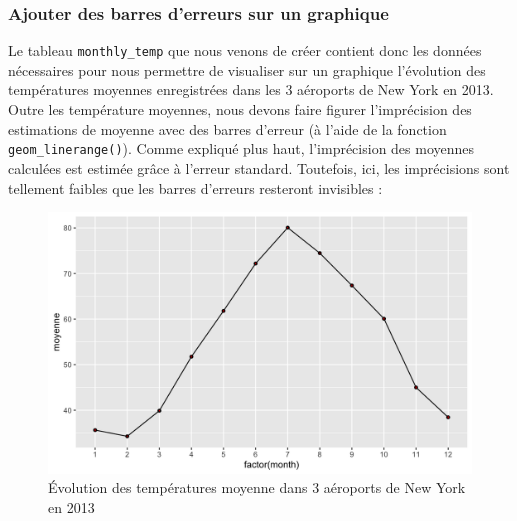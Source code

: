 \documentclass[a4paperpaper,]{article}
\newenvironment{Shaded}{\begin{snugshade}}{\end{snugshade}}
\newcommand{\DataTypeTok}[1]{\textcolor[rgb]{0.00,0.34,0.68}{#1}}
\newcommand{\DecValTok}[1]{\textcolor[rgb]{0.69,0.50,0.00}{#1}}
\newcommand{\KeywordTok}[1]{\textcolor[rgb]{0.12,0.11,0.11}{\textbf{#1}}}
\newcommand{\NormalTok}[1]{\textcolor[rgb]{0.12,0.11,0.11}{#1}}
\newcommand{\OperatorTok}[1]{\textcolor[rgb]{0.12,0.11,0.11}{#1}}
\newcommand{\StringTok}[1]{\textcolor[rgb]{0.75,0.01,0.01}{#1}}
\begin{document}
\hypertarget{ajouter-des-barres-derreurs-sur-un-graphique}{%
\subsubsection{Ajouter des barres d'erreurs sur un graphique}\label{ajouter-des-barres-derreurs-sur-un-graphique}}

Le tableau \texttt{monthly\_temp} que nous venons de créer contient donc les données nécessaires pour nous permettre de visualiser sur un graphique l'évolution des températures moyennes enregistrées dans les 3 aéroports de New York en 2013. Outre les température moyennes, nous devons faire figurer l'imprécision des estimations de moyenne avec des barres d'erreur (à l'aide de la fonction \texttt{geom\_linerange()}). Comme expliqué plus haut, l'imprécision des moyennes calculées est estimée grâce à l'erreur standard. Toutefois, ici, les imprécisions sont tellement faibles que les barres d'erreurs resteront invisibles :

\begin{Shaded}
\end{Shaded}

\begin{figure}[htpb]

{\centering \includegraphics[width=0.9\linewidth]{figure/errorbars-1} 

}

\caption{Évolution des températures moyenne dans 3 aéroports de New York en 2013}\label{fig:errorbars}
\end{figure}
\end{document}
